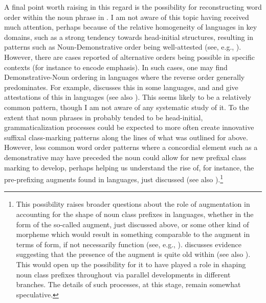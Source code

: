 \documentclass[output=paper ,collection	  ,collectionchapter ,biblatexbackend=biber   ]{langscibook}
\begin{document}
\largerpage[-2]
A final point worth raising in this regard is the possibility for reconstructing
word order within the noun phrase in . I am not aware of this
topic having received much attention, perhaps because of the relative
homogeneity of  languages in key domains, such as a strong
tendency towards head-initial structures, resulting in patterns such as
Noun-Demonstrative order being well-attested (see, e.g.,
). However, there are cases reported of alternative
orders being possible in specific contexts (for instance to encode emphasis). In
such cases, one may find Demonstrative-Noun ordering in languages where the
reverse order generally predominates. For example, 
discusses this in some  languages, and 
and  give attestations of this in 
languages (see also \citealt[248]{Watters2003}). This seems likely to be a
relatively common pattern, though I am not aware of any systematic study of it.
To the extent that noun phrases in  probably tended to be
head-initial, grammaticalization processes could be expected to more often
create innovative suffixal class-marking patterns along the lines of what was
outlined for  above. However, less common word order patterns where a
concordial element such as a demonstrative may have preceded the noun could
allow for new prefixal class marking to develop, perhaps helping us understand
the rise of, for instance, the pre-prefixing augments found in  languages,
just discussed (see also \citealt[99]{Meeussen1967}).{\footnote{This
possibility raises broader questions about the role of augmentation in
accounting for the shape of noun class prefixes in 
languages, whether in the form of the so-called augment, just discussed above,
or some other kind of morpheme which would result in something comparable to the
augment in terms of form, if not necessarily function (see, e.g.,
).  discusses
evidence suggesting that the presence of the augment is quite old within
 (see also ). This would open up the
possibility for it to have played a role in shaping noun class prefixes
throughout  via parallel developments in different branches.
The details of such processes, at this stage, remain somewhat speculative.}}
\end{document}
